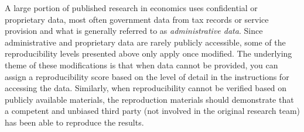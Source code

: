\documentclass[]{book}
\begin{document}
A large portion of published research in economics uses confidential or proprietary data, most often government data from tax records or service provision and what is generally referred to as \emph{administrative data}. Since administrative and proprietary data are rarely publicly accessible, some of the reproducibility levels presented above only apply once modified. The underlying theme of these modifications is that when data cannot be provided, you can assign a reproducibility score based on the level of detail in the instructions for accessing the data. Similarly, when reproducibility cannot be verified based on publicly available materials, the reproduction materials should demonstrate that a competent and unbiased third party (not involved in the original research team) has been able to reproduce the results.
\end{document}
